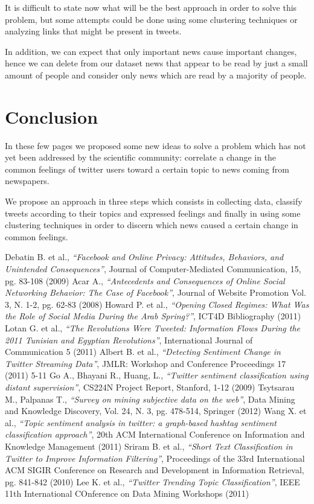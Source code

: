 \documentclass[a4paper]{article}
\begin{document}
It is difficult to state now what will be the best approach in order to solve
this problem, but some attempts could be done using some clustering techniques
or analyzing links that might be present in tweets.

In addition, we can expect that only important news cause important changes,
hence we can delete from our dataset news that appear to be read by just a small
amount of people and consider only news which are read by a majority of people.

\section{Conclusion}
In these few pages we proposed some new ideas to solve a problem which has not
yet been addressed by the scientific community: correlate a change in the common
feelings of twitter users toward a certain topic to news coming from newspapers.

We propose an approach in three steps which consists in collecting data,
classify tweets according to their topics and expressed feelings and finally in
using some clustering techniques in order to discern which news caused a certain
change in common feelings.


\begin{thebibliography}{9}
Debatin B. et al., \emph{``Facebook and Online Privacy: Attitudes, Behaviors,
and Unintended Consequences''}, Journal of Computer-Mediated Communication,
15, pg. 83-108 (2009)
Acar A., \emph{``Antecedents and Consequences of Online Social Networking
Behavior: The Case of Facebook''}, Journal of Website Promotion Vol. 3, N.
1-2, pg. 62-83 (2008)
Howard P. et al., \emph{``Opening Closed Regimes: What Was the Role of Social Media
During the Arab Spring?''}, ICT4D Bibliography (2011)
Lotan G. et al., \emph{``The Revolutions Were Tweeted: Information Flows During
the 2011 Tunisian and Egyptian Revolutions''}, International Journal of
Communication 5 (2011)
Albert B. et al., \emph{``Detecting Sentiment Change in Twitter Streaming
	Data''}, JMLR: Workshop and Conference Proceedings 17 (2011) 5-11
Go A., Bhayani R., Huang, L., \emph{``Twitter sentiment classification using
	distant supervision''}, CS224N Project Report, Stanford, 1-12 (2009)
Tsytsarau M., Palpanas T., \emph{``Survey on mining subjective data on the
	web''}, Data Mining and Knowledge Discovery, Vol. 24, N. 3, pg. 478-514,
	Springer (2012)
Wang X. et al., \emph{``Topic sentiment analysis in twitter: a graph-based
hashtag sentiment classification approach''}, 20th ACM International
Conference on Information and Knowledge Management (2011) 
Sriram B. et al., \emph{``Short Text Classification in Twitter to Improve
	Information Filtering''}, Proceedings of the 33rd International ACM SIGIR
	Conference on Research and Development in Information Retrieval, pg. 841-842 (2010)
Lee K. et al., \emph{``Twitter Trending Topic Classification''}, IEEE 11th
International COnference on Data Mining Workshops (2011)
\end{thebibliography}
\end{document}
